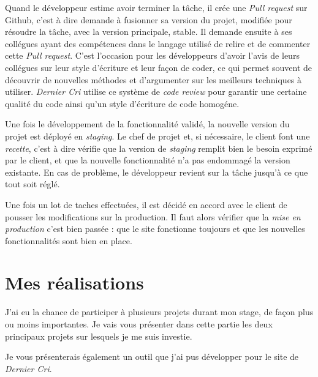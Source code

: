 \documentclass[12pt,a4paper]{article}
\begin{document}
  \bigskip

  Quand le développeur estime avoir terminer la tâche, il crée une
  \emph{Pull request} sur Github, c'est à dire demande à fusionner sa
  version du projet, modifiée pour résoudre la tâche, avec la version
  principale, stable. Il demande ensuite à ses collégues ayant des
  compétences dans le langage utilisé de relire et de commenter cette
  \emph{Pull request}. C'est l'occasion pour les développeurs d'avoir
  l'avis de leurs collégues sur leur style d'écriture et leur façon de
  coder, ce qui permet souvent de découvrir de nouvelles méthodes et
  d'argumenter sur les meilleurs techniques à utiliser. \emph{Dernier Cri}
  utilise ce système de \emph{code review} pour garantir une certaine
  qualité du code ainsi qu'un style d'écriture de code homogéne.

  \bigskip

  Une fois le développement de la fonctionnalité validé, la nouvelle
  version du projet est déployé en \emph{staging}. Le chef de projet et,
  si nécessaire, le client font une \emph{recette}, c'est à dire vérifie
  que la version de \emph{staging} remplit bien le besoin exprimé par le
  client, et que la nouvelle fonctionnalité n'a pas endommagé la version
  existante. En cas de problème, le développeur revient sur la tâche
  jusqu'à ce que tout soit réglé.

  \bigskip

  Une fois un lot de taches effectuées, il est décidé en accord avec le
  client de pousser les modifications sur la production. Il faut alors
  vérifier que la \emph{mise en production} c'est bien passée : que le
  site fonctionne toujours et que les nouvelles fonctionnalités sont bien
  en place.

  \newpage

  \section{Mes réalisations}\label{mes-ruxe9alisations}

  \bigskip

  J'ai eu la chance de participer à plusieurs projets durant mon stage, de
  façon plus ou moins importantes. Je vais vous présenter dans cette
  partie les deux principaux projets sur lesquels je me suis investie.

  \bigskip

  Je vous présenterais également un outil que j'ai pus développer pour le
  site de \emph{Dernier Cri}.
\end{document}
